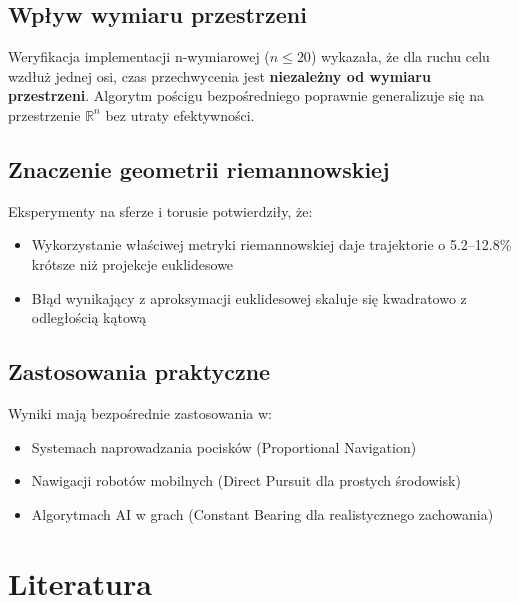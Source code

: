 \documentclass[12pt,a4paper]{article}
\begin{document}
\subsection{Wpływ wymiaru przestrzeni}

Weryfikacja implementacji n-wymiarowej ($n \leq 20$) wykazała, że dla ruchu celu wzdłuż jednej osi, czas przechwycenia jest \textbf{niezależny od wymiaru przestrzeni}. Algorytm pościgu bezpośredniego poprawnie generalizuje się na przestrzenie $\mathbb{R}^n$ bez utraty efektywności.

\subsection{Znaczenie geometrii riemannowskiej}

Eksperymenty na sferze i torusie potwierdziły, że:
\begin{itemize}
    \item Wykorzystanie właściwej metryki riemannowskiej daje trajektorie o 5.2--12.8\% krótsze niż projekcje euklidesowe
    \item Błąd wynikający z aproksymacji euklidesowej skaluje się kwadratowo z odległością kątową
\end{itemize}

\subsection{Zastosowania praktyczne}

Wyniki mają bezpośrednie zastosowania w:
\begin{itemize}
    \item Systemach naprowadzania pocisków (Proportional Navigation)
    \item Nawigacji robotów mobilnych (Direct Pursuit dla prostych środowisk)
    \item Algorytmach AI w grach (Constant Bearing dla realistycznego zachowania)
\end{itemize}

\section*{Literatura}
\end{document}
